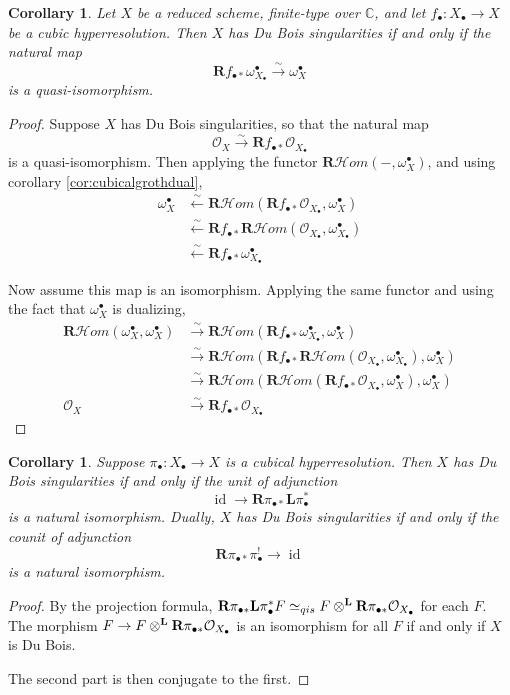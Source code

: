 \documentclass{report}
\newtheorem{cor}[theorem]{Corollary}
\theoremstyle{definition}
\newcommand{\cHom}{\mathcal{H} \textit{om}}
\DeclareMathOperator{\id}{id}
\newcommand{\CC}{\mathbb{C}}
\newcommand{\bL}{\textbf{L}}
\newcommand{\OO}{\mathcal{O}}
\newcommand{\qis}{\simeq_{qis}}
\newcommand{\bR}{\textbf{R}}
\newcommand{\otimesL}{\otimes^{\bf L}}
\begin{document}
\begin{cor}
	Let $X$ be a reduced scheme, finite-type over $\CC$, and let $f_\bullet : X_\bullet \rightarrow X$ be a cubic hyperresolution.
	Then $X$ has Du Bois singularities if and only if the natural map
	\[
		\bR f_{\bullet *} \omega^\bullet_{X_\bullet} \xrightarrow{\sim} \omega^\bullet_X
	\]
	is a quasi-isomorphism.
\end{cor}
\begin{proof}
	Suppose $X$ has Du Bois singularities, so that the natural map
	\[
		\OO_X \xrightarrow{\sim} \bR f_{\bullet *} \OO_{X_\bullet}
	\]
	is a quasi-isomorphism.
	Then applying the functor $\bR \cHom(-,\omega_X^\bullet)$, and using corollary \ref{cor:cubicalgrothdual},
	\begin{align*}
		\omega_X^\bullet &\xleftarrow{\sim} \bR \cHom(\bR f_{\bullet *} \OO_{X_\bullet}, \omega_X^\bullet) \\
		&\xleftarrow{\sim} \bR f_{\bullet *} \bR \cHom(\OO_{X_\bullet}, \omega_{X_\bullet}^\bullet) \\
		&\xleftarrow{\sim} \bR f_{\bullet *} \omega_{X_\bullet}^\bullet
	\end{align*}
	
	Now assume this map is an isomorphism.
	Applying the same functor and using the fact that $\omega_X^\bullet$ is dualizing,
	\begin{align*}
		\bR \cHom(\omega_X^\bullet, \omega_X^\bullet) &\xrightarrow{\sim} \bR \cHom(\bR f_{\bullet *} \omega_{X_\bullet}^\bullet, \omega_X^\bullet) \\
		&\xrightarrow{\sim} \bR \cHom(\bR f_{\bullet *} \bR \cHom(\OO_{X_\bullet}, \omega_{X_\bullet}^\bullet), \omega_{X}^\bullet) \\
		&\xrightarrow{\sim} \bR \cHom(\bR \cHom(\bR f_{\bullet *} \OO_{X_\bullet}, \omega_X^\bullet), \omega_X^\bullet) \\
		\OO_X &\xrightarrow{\sim} \bR f_{\bullet *} \OO_{X_\bullet}
	\end{align*}
\end{proof}

\begin{cor}
	Suppose $\pi_\bullet : X_\bullet \rightarrow X$ is a cubical hyperresolution.
	Then $X$ has Du Bois singularities if and only if the unit of adjunction
	\[
		\id \rightarrow \bR \pi_{\bullet *} \bL \pi_\bullet^*
	\]
	is a natural isomorphism.
	Dually, $X$ has Du Bois singularities if and only if the counit of adjunction
	\[
		\bR \pi_{\bullet *} \pi_\bullet^! \rightarrow \id
	\]
	is a natural isomorphism.
\end{cor}
\begin{proof}
	By the projection formula, $\bR \pi_{\bullet *} \bL \pi_\bullet^* F \qis F \otimesL \bR \pi_{\bullet *} \OO_{X_\bullet}$ for each $F$.
	The morphism $F \rightarrow F \otimesL \bR \pi_{\bullet *} \OO_{X_\bullet}$ is an isomorphism for all $F$ if and only if $X$ is Du Bois.
	
	The second part is then conjugate to the first.
\end{proof}
\end{document}
